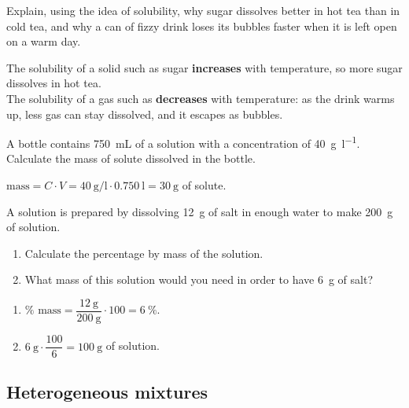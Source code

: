 \begin{exercise}
    Explain, using the idea of solubility, why sugar dissolves better in hot tea than in cold tea, and why a can of fizzy drink loses its bubbles faster when it is left open on a warm day.
    \begin{solu}
        The solubility of a solid such as sugar \textbf{increases} with temperature, so more sugar dissolves in hot tea. \\
        The solubility of a gas such as  \textbf{decreases} with temperature: as the drink warms up, less gas can stay dissolved, and it escapes as bubbles.
    \end{solu}
\end{exercise}

\begin{exercise}
    A bottle contains \qty{750}{\mL} of a solution with a concentration of \qty{40}{\g\per\litre}. Calculate the mass of solute dissolved in the bottle.
    \begin{solu}
        \(\text{mass} = C \cdot V = \qty{40}{\g\per\litre} \cdot \qty{0.750}{\litre} = \qty{30}{\g}\) of solute.
    \end{solu}
\end{exercise}

\begin{exercise}
    A solution is prepared by dissolving \qty{12}{\g} of salt in enough water to make \qty{200}{\g} of solution.
    \begin{enumerate}[label=\letraminuscula]
        \item Calculate the percentage by mass of the solution.
        \item What mass of this solution would you need in order to have \qty{6}{\g} of salt?
    \end{enumerate}
    \begin{solu}
        \begin{enumerate}[label=\alph*)]
            \item \(\% \text{ mass} = \dfrac{\qty{12}{\g}}{\qty{200}{\g}} \cdot 100 = \qty{6}{\percent}\).
            \item \(\qty{6}{\g} \cdot \dfrac{100}{6} = \qty{100}{\g}\) of solution.
        \end{enumerate}
    \end{solu}
\end{exercise}

\subsection{Heterogeneous mixtures}

